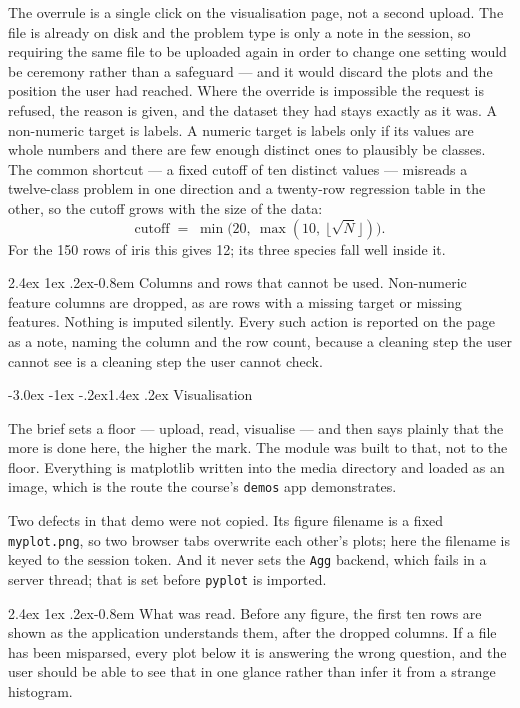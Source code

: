 \documentclass[11pt,a4paper]{article}
\makeatletter
\renewcommand\subsection{\@startsection{subsection}{2}{\z@}%
  {-3.0ex \@plus -1ex \@minus -.2ex}{1.4ex \@plus .2ex}%
  {\normalfont\large\sffamily\bfseries\color{accent}}}
\renewcommand\paragraph{\@startsection{paragraph}{4}{\z@}%
  {2.4ex \@plus1ex \@minus.2ex}{-0.8em}%
  {\normalfont\normalsize\sffamily\bfseries\color{code}}}
\newcommand{\file}[1]{\texttt{\small #1}}
\makeatother
\begin{document}
The overrule is a single click on the visualisation page, not a second upload.
The file is already on disk and the problem type is only a note in the session,
so requiring the same file to be uploaded again in order to change one setting
would be ceremony rather than a safeguard --- and it would discard the plots and
the position the user had reached. Where the override is impossible the request
is refused, the reason is given, and the dataset they had stays exactly as it
was. A non-numeric target is labels. A numeric target is labels
only if its values are whole numbers and there are few enough distinct ones to
plausibly be classes. The common shortcut --- a fixed cutoff of ten distinct
values --- misreads a twelve-class problem in one direction and a twenty-row
regression table in the other, so the cutoff grows with the size of the data:
\[
  \text{cutoff} \;=\; \min\!\bigl(20,\ \max(10,\ \lfloor\sqrt{N}\rfloor)\bigr).
\]
For the 150 rows of iris this gives 12; its three species fall well inside it.

\paragraph{Columns and rows that cannot be used.} Non-numeric feature columns are
dropped, as are rows with a missing target or missing features. Nothing is
imputed silently. Every such action is reported on the page as a note, naming the
column and the row count, because a cleaning step the user cannot see is a
cleaning step the user cannot check.

\subsection{Visualisation}

The brief sets a floor --- upload, read, visualise --- and then says plainly that
the more is done here, the higher the mark. The module was built to that, not to
the floor. Everything is matplotlib written into the media directory and loaded
as an image, which is the route the course's \file{demos} app demonstrates.

Two defects in that demo were not copied. Its figure filename is a fixed
\file{myplot.png}, so two browser tabs overwrite each other's plots; here the
filename is keyed to the session token. And it never sets the \texttt{Agg}
backend, which fails in a server thread; that is set before \texttt{pyplot} is
imported.

\paragraph{What was read.} Before any figure, the first ten rows are shown as the
application understands them, after the dropped columns. If a file has been
misparsed, every plot below it is answering the wrong question, and the user
should be able to see that in one glance rather than infer it from a strange
histogram.
\end{document}
